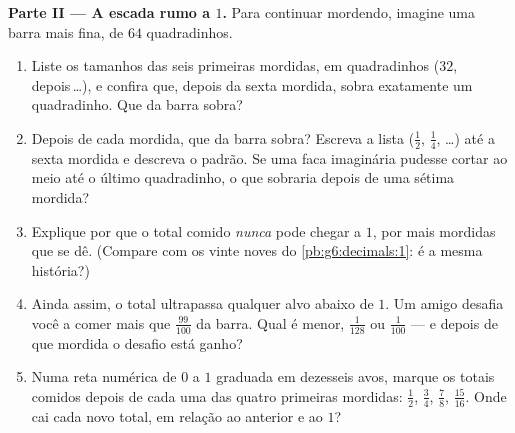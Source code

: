 \begin{problem}
\medskip
\noindent\textbf{Parte II --- A escada rumo a $1$.}
Para continuar mordendo, imagine uma barra mais fina, de $64$
quadradinhos.
\begin{enumerate}[resume]
  \item Liste os tamanhos das seis primeiras mordidas, em quadradinhos
        ($32$, depois\,\dots), e confira que, depois da sexta mordida,
        sobra exatamente um quadradinho. Que  da barra sobra?
  \item Depois de cada mordida, que  da barra sobra? Escreva a
        lista ($\frac12$, $\frac14$, \dots) até a sexta mordida e
        descreva o padrão. Se uma faca imaginária pudesse cortar ao
        meio até o último quadradinho, o que sobraria depois de uma
        sétima mordida?
  \item Explique por que o total comido \emph{nunca} pode chegar a $1$,
        por mais mordidas que se dê. (Compare com os vinte noves do
        \cref{pb:g6:decimals:1}: é a mesma história?)
  \item Ainda assim, o total ultrapassa qualquer alvo abaixo de $1$. Um
        amigo desafia você a comer mais que $\frac{99}{100}$ da barra.
        Qual é menor, $\frac{1}{128}$ ou $\frac{1}{100}$ --- e depois
        de que mordida o desafio está ganho?
  \item Numa reta numérica de $0$ a $1$ graduada em dezesseis avos,
        marque os totais comidos depois de cada uma das quatro
        primeiras mordidas: $\frac12$, $\frac34$, $\frac78$,
        $\frac{15}{16}$. Onde cai cada novo total, em relação ao
        anterior e ao $1$?
\end{enumerate}


\end{problem}
